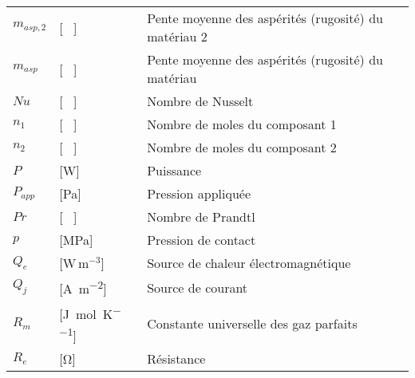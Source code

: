 \begin{longtable}{l p{2.5cm} p{4in}}
	$m_{asp,2}$       & [ \ ]                                               & Pente moyenne des aspérités (rugosité) du matériau 2                                  \\
	$m_{asp}$         & [ \ ]                                               & Pente moyenne des aspérités (rugosité) du matériau                                    \\
	$Nu$              & [ \ ]                                               & Nombre de Nusselt                                                                     \\
	$n_1$             & [ \ ]                                               & Nombre de moles du composant 1                                                        \\
	$n_2$             & [ \ ]                                               & Nombre de moles du composant 2                                                        \\
	$P$               & [\si{\watt}]                                        & Puissance                                                                             \\
	$P_{app}$         & [\si{\pascal}]                                      & Pression appliquée                                                                    \\
	$Pr$              & [ \ ]                                               & Nombre de Prandtl                                                                     \\
	$p$               & [\si{\mega\pascal}]                                 & Pression de contact                                                                   \\
	$Q_e$             & [W\,m$^{-3}$]                                       & Source de chaleur électromagnétique                                                   \\
	$Q_j$             & [\si{\ampere\per\square\metre}]                     & Source de courant                                                                     \\
	$R_m$             & [\si{\joule\per\mole\per\kelvin}]                   & Constante universelle des gaz parfaits                                                \\
	$R_e$             & [\si{\ohm}]                                         & Résistance                                                                            \\

\end{longtable}
